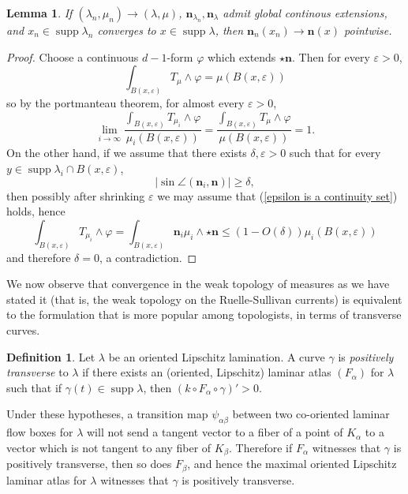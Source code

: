 \documentclass[reqno,11pt]{amsart}
\DeclareMathOperator{\supp}{supp}
\newcommand{\normal}{\mathbf n}
\newcommand{\dfn}[1]{\emph{#1}\index{#1}}
\newtheorem{lemma}[theorem]{Lemma}
\theoremstyle{definition}
\newtheorem{definition}[theorem]{Definition}
\numberwithin{equation}{section}
\begin{document}
\begin{lemma}\label{convergence of normals}
If $(\lambda_n, \mu_n) \to (\lambda, \mu)$, $\normal_{\lambda_n}, \normal_\lambda$ admit global continous extensions, and $x_n \in \supp \lambda_n$ converges to $x \in \supp \lambda$, then $\normal_n(x_n) \to \normal(x)$ pointwise.
\end{lemma}
\begin{proof}
	Choose a continuous $d-1$-form $\varphi$ which extends $\star \normal$.
	Then for every $\varepsilon > 0$,
	$$\int_{B(x, \varepsilon)} T_\mu \wedge \varphi = \mu(B(x, \varepsilon))$$
	so by the portmanteau theorem, for almost every $\varepsilon > 0$,
	\begin{equation}\label{epsilon is a continuity set}
		\lim_{i \to \infty} \frac{\int_{B(x, \varepsilon)} T_{\mu_i} \wedge \varphi}{\mu_i(B(x, \varepsilon))} = \frac{\int_{B(x, \varepsilon)} T_\mu \wedge \varphi}{\mu(B(x, \varepsilon))} = 1.
	\end{equation}
	On the other hand, if we assume that there exists $\delta, \varepsilon > 0$ such that for every $y \in \supp \lambda_i \cap B(x, \varepsilon)$,
	$$|\sin \angle(\normal_i, \normal)| \geq \delta,$$
	then possibly after shrinking $\varepsilon$ we may assume that (\ref{epsilon is a continuity set}) holds, hence
	$$\int_{B(x, \varepsilon)} T_{\mu_i} \wedge \varphi = \int_{B(x, \varepsilon)} \normal_i\mu_i \wedge \star \normal \leq (1 - O(\delta)) \mu_i(B(x, \varepsilon))$$
	and therefore $\delta = 0$, a contradiction.
\end{proof}

We now observe that convergence in the weak topology of measures as we have stated it (that is, the weak topology on the Ruelle-Sullivan currents) is equivalent to the formulation that is more popular among topologists, in terms of transverse curves.

\begin{definition}
	Let $\lambda$ be an oriented Lipschitz lamination. A curve $\gamma$ is \dfn{positively transverse} to $\lambda$ if there exists an (oriented, Lipschitz) laminar atlas $(F_\alpha)$ for $\lambda$ such that if $\gamma(t) \in \supp \lambda$, then $(k \circ F_\alpha \circ \gamma)' > 0$.
\end{definition}

Under these hypotheses, a transition map $\psi_{\alpha \beta}$ between two co-oriented laminar flow boxes for $\lambda$ will not send a tangent vector to a fiber of a point of $K_\alpha$ to a vector which is not tangent to any fiber of $K_\beta$.
Therefore if $F_\alpha$ witnesses that $\gamma$ is positively transverse, then so does $F_\beta$, and hence the maximal oriented Lipschitz laminar atlas for $\lambda$ witnesses that $\gamma$ is positively transverse.
\end{document}
